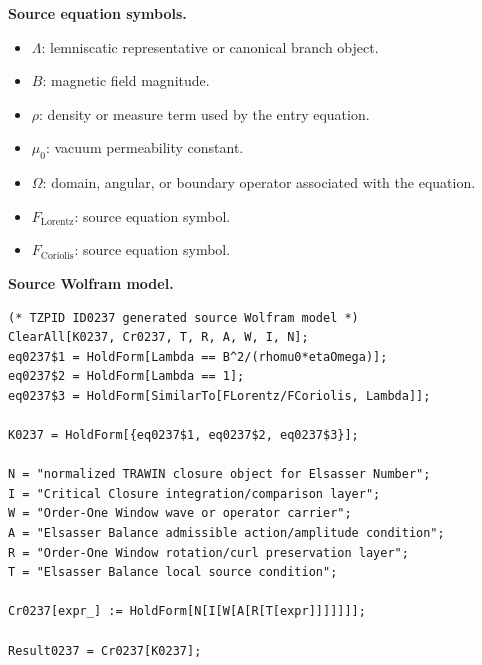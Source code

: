 \begin{minipage}[t]{0.49\linewidth}
\begingroup
\small
\raggedright
\textbf{Source equation symbols.}\par
\begin{itemize}[leftmargin=1.35em,itemsep=1pt,topsep=1pt,parsep=0pt]
    \item $\Lambda$: lemniscatic representative or canonical branch object.
    \item $B$: magnetic field magnitude.
    \item $\rho$: density or measure term used by the entry equation.
    \item $\mu_0$: vacuum permeability constant.
    \item $\Omega$: domain, angular, or boundary operator associated with the equation.
    \item $F_{\mathrm{Lorentz}}$: source equation symbol.
    \item $F_{\mathrm{Coriolis}}$: source equation symbol.
\end{itemize}
\endgroup
\end{minipage}\hfill
\begin{minipage}[t]{0.47\linewidth}
\begingroup
\scriptsize
\raggedright
\textbf{Source Wolfram model.}\par
\begin{Verbatim}[fontsize=\tiny,breaklines=true,breakanywhere=true]
(* TZPID ID0237 generated source Wolfram model *)
ClearAll[K0237, Cr0237, T, R, A, W, I, N];
eq0237$1 = HoldForm[Lambda == B^2/(rhomu0*etaOmega)];
eq0237$2 = HoldForm[Lambda == 1];
eq0237$3 = HoldForm[SimilarTo[FLorentz/FCoriolis, Lambda]];

K0237 = HoldForm[{eq0237$1, eq0237$2, eq0237$3}];

N = "normalized TRAWIN closure object for Elsasser Number";
I = "Critical Closure integration/comparison layer";
W = "Order-One Window wave or operator carrier";
A = "Elsasser Balance admissible action/amplitude condition";
R = "Order-One Window rotation/curl preservation layer";
T = "Elsasser Balance local source condition";

Cr0237[expr_] := HoldForm[N[I[W[A[R[T[expr]]]]]]];

Result0237 = Cr0237[K0237];
\end{Verbatim}
\endgroup
\end{minipage}


